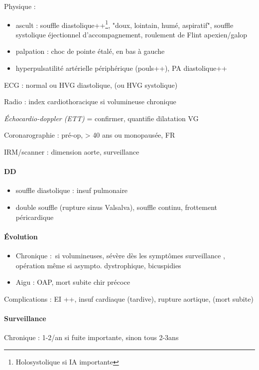 Physique : 
\begin{itemize}
  \item ascult : souffle diastolique++\footnote{Holosystolique si IA importante}, "doux, lointain, humé, aspiratif",
    souffle systolique éjectionnel d'accompagnement, roulement de Flint
    apexien/galop
  \item palpation : choc de pointe étalé, en bas à gauche
  \item hyperpulsatilité artérielle périphérique (pouls++), \dec PA
    diastolique++
\end{itemize}

ECG : normal ou \gls{HVG} diastolique, (ou HVG systolique)

Radio : \inc index cardiothoracique si volumineuse chronique

\textit{Échocardio-doppler (ETT)} = confirmer, quantifie dilatation VG 

Coronarographie : pré-op, \male > 40 ans ou \female monopausée, FR

IRM/scanner : dimension aorte, surveillance

\paragraph{DD} 
\begin{itemize}
  \item souffle diastolique : insuf pulmonaire
  \item double souffle (rupture sinus Valsalva), souffle continu, frottement
    péricardique
\end{itemize}
\paragraph{Évolution}
\begin{itemize}
  \item Chronique : si volumineuses, sévère dès les symptômes \thus surveillance
\danger, opération même si asympto. \danger dystrophique, bicuspidies
  \item Aigu : OAP, mort subite \thus chir précoce
\end{itemize}

Complications : EI ++, insuf cardiaque (tardive), rupture aortique, (mort subite)
   
\paragraph{Surveillance} 
Chronique : 1-2/an si fuite importante, sinon tous 2-3ans

